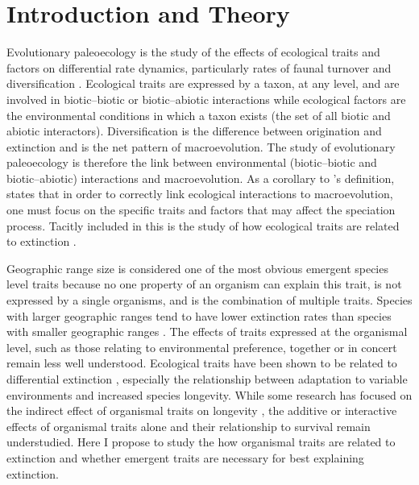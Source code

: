 \documentclass[12pt,letterpaper]{article}
\begin{document}
\section{Introduction and Theory}
%
Evolutionary paleoecology is the study of the effects of ecological traits and factors on differential rate dynamics, particularly rates of faunal turnover and diversification \citep{Kitchell1985a}. Ecological traits are expressed by a taxon, at any level, and are involved in biotic--biotic or biotic--abiotic interactions while ecological factors are the environmental conditions in which a taxon exists (the set of all biotic and abiotic interactors). Diversification is the difference between origination and extinction and is the net pattern of macroevolution. The study of evolutionary paleoecology is therefore the link between environmental (biotic--biotic and biotic--abiotic) interactions and macroevolution. As a corollary to \citet{Kitchell1985a}'s definition, \citet{Allmon1994} states that in order to correctly link ecological interactions to macroevolution, one must focus on the specific traits and factors that may affect the speciation process. Tacitly included in this is the study of how ecological traits are related to extinction \citep{Kitchell1990}.

Geographic range size is considered one of the most obvious emergent species level traits \citep{Jablonski2008a} because no one property of an organism can explain this trait, is not expressed by a single organisms, and is the combination of multiple traits. Species with larger geographic ranges tend to have lower extinction rates than species with smaller geographic ranges \citep{Jablonski1986,Harnik2013,Nurnberg2013a,Jablonski2003,Roy2009c}. The effects of traits expressed at the organismal level, such as those relating to environmental preference, together or in concert remain less well understood. Ecological traits have been shown to be related to differential extinction \citep{Foote2013,Liow2007b,Baumiller1993,Nurnberg2013a}, especially the relationship between adaptation to variable environments and increased species longevity. While some research has focused on the indirect effect of organismal traits on longevity \citep{Harnik2011}, the additive or interactive effects of organismal traits alone and their relationship to survival remain understudied. Here I propose to study the how organismal traits are related to extinction and whether emergent traits are necessary for best explaining extinction.
\end{document}
